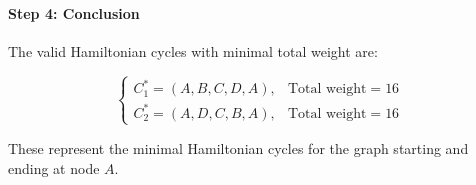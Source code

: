 \paragraph{Step 4: Conclusion}

The valid Hamiltonian cycles with minimal total weight are:

\[
\boxed{
\begin{cases}
C^{*}_1 = (A, B, C, D, A), & \text{Total weight} = 16 \\
C^{*}_2 = (A, D, C, B, A), & \text{Total weight} = 16
\end{cases}
}
\]

These represent the minimal Hamiltonian cycles for the graph starting and ending at node $A$.